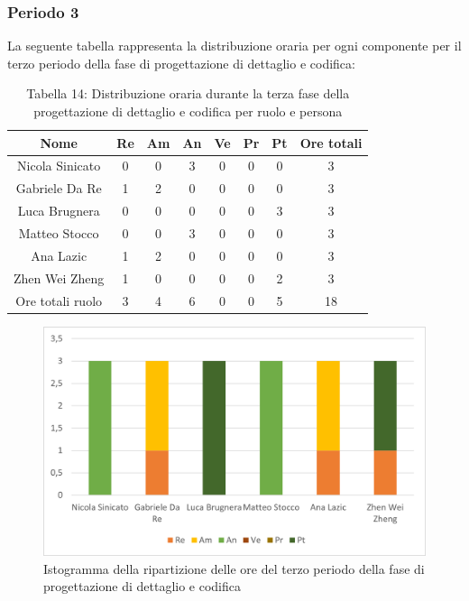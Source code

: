 \subsubsection{Periodo 3}
%
La seguente tabella rappresenta la distribuzione oraria per ogni componente per il terzo periodo della fase di progettazione di dettaglio e codifica:
\begin{table}[h]
	\setlength\extrarowheight{5pt}
	\centering
	\begin{tabularx}{\textwidth}{|ccccccc|c|}
		\hline
		\rowcolor{white}
		\textbf{Nome} & \textbf{Re} & \textbf{Am} & \textbf{An} & \textbf{Ve} & \textbf{Pr}& \textbf{Pt} & \textbf{Ore totali} \\
		\hline
		Nicola Sinicato &0&0&3&0&0&0&3 \\
		Gabriele Da Re &1&2&0&0&0&0&3 \\
		Luca Brugnera &0&0&0&0&0&3&3 \\
		Matteo Stocco &0&0&3&0&0&0&3 \\
		Ana Lazic &1&2&0&0&0&0&3 \\
		Zhen Wei Zheng &1&0&0&0&0&2&3 \\
		\hline
		Ore totali ruolo &3&4&6&0&0&5&18 \\
		\hline
	\end{tabularx}
	\vspace{10pt}
	\caption{Tabella 14: Distribuzione oraria durante la terza fase della progettazione di dettaglio e codifica per ruolo e persona}
\end{table}
\begin{figure}[H]
    \centering
    \includegraphics[scale=0.6]{img/grafi preventivo/istogrammi/codifica/periodo3.png}
    \caption{Istogramma della ripartizione delle ore del terzo periodo della fase di progettazione di dettaglio e codifica}
\end{figure}
